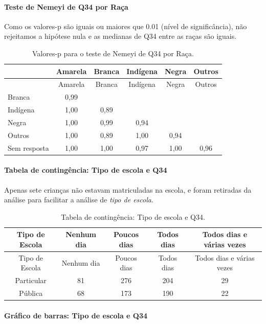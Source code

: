 \documentclass[]{article}
\let\oldparagraph\paragraph
\renewcommand{\paragraph}[1]{\oldparagraph{#1}\mbox{}}
\begin{document}
\hypertarget{teste-de-nemeyi-de-q34-por-rauxe7a}{%
\paragraph{Teste de Nemeyi de Q34 por Raça}\label{teste-de-nemeyi-de-q34-por-rauxe7a}}

Como os valores-p são iguais ou maiores que 0.01 (nível de significância), não rejeitamos a hipótese nula e as medianas de Q34 entre as raças são iguais.

\begin{longtable}[]{@{}lccccc@{}}
\caption{\label{tab:unnamed-chunk-1232}Valores-p para o teste de Nemeyi de Q34 por Raça.}\tabularnewline
\toprule
& Amarela & Branca & Indígena & Negra & Outros\tabularnewline
\midrule
\endfirsthead
\toprule
& Amarela & Branca & Indígena & Negra & Outros\tabularnewline
\midrule
\endhead
Branca & 0,99 & & & &\tabularnewline
Indígena & 1,00 & 0,89 & & &\tabularnewline
Negra & 1,00 & 0,99 & 0,94 & &\tabularnewline
Outros & 1,00 & 0,89 & 1,00 & 0,94 &\tabularnewline
Sem resposta & 1,00 & 1,00 & 0,97 & 1,00 & 0,96\tabularnewline
\bottomrule
\end{longtable}

\cleardoublepage

\hypertarget{tabela-de-continguxeancia-tipo-de-escola-e-q34}{%
\paragraph{Tabela de contingência: Tipo de escola e Q34}\label{tabela-de-continguxeancia-tipo-de-escola-e-q34}}

Apenas sete crianças não estavam matriculadas na escola, e foram retiradas da análise para facilitar a análise de \emph{tipo de escola}.

\begin{longtable}[]{@{}ccccc@{}}
\caption{\label{tab:unnamed-chunk-1233}Tabela de contingência: Tipo de escola e Q34.}\tabularnewline
\toprule
Tipo de Escola & Nenhum dia & Poucos dias & Todos dias & Todos dias e várias vezes\tabularnewline
\midrule
\endfirsthead
\toprule
Tipo de Escola & Nenhum dia & Poucos dias & Todos dias & Todos dias e várias vezes\tabularnewline
\midrule
\endhead
Particular & 81 & 276 & 204 & 29\tabularnewline
Pública & 68 & 173 & 190 & 22\tabularnewline
\bottomrule
\end{longtable}

\hypertarget{gruxe1fico-de-barras-tipo-de-escola-e-q34}{%
\paragraph{Gráfico de barras: Tipo de escola e Q34}\label{gruxe1fico-de-barras-tipo-de-escola-e-q34}}
\end{document}
